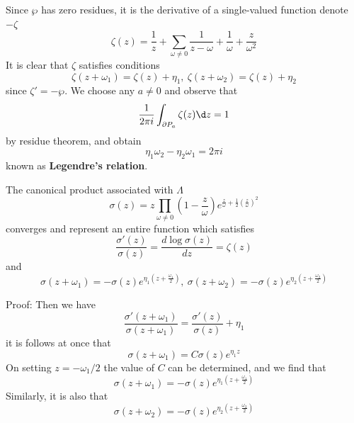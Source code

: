 \documentclass[12pt, oneside]{book}
\begin{document}
\begin{theorem}
    Since $\wp$ has zero residues, it is the derivative of a single-valued function denote $-\zeta$
    \begin{equation*}
        \zeta(z)=\frac{1}{z}+\sum_{\omega\neq 0} \frac{1}{z-\omega} +\frac{1}{\omega} + \frac{z}{\omega^2}
    \end{equation*}
    It is clear that $\zeta$ satisfies conditions
    \begin{equation*}
        \zeta(z+\omega_1)=\zeta(z)+\eta_1,\
        \zeta(z+\omega_2)=\zeta(z)+\eta_2
    \end{equation*}
    since $\zeta'= - \wp$.
    We choose any $a\neq 0 $ and observe that
    \begin{equation*}
        \frac{1}{2\pi i} \int_{\partial P_a} \zeta(z) \d z
        =
        1
    \end{equation*}
    by residue theorem, and obtain
    \begin{equation*}
        \eta_1 \omega_2 -\eta_2 \omega_1 =2\pi i
    \end{equation*}
    known as \textbf{Legendre's relation}.
\end{theorem}

\begin{theorem}
    The canonical product associated with $\Lambda$
    \begin{equation*}
        \sigma(z)
        =
        z\prod_{\omega\neq 0} \left(1-\frac{z}{\omega}\right) e^{\frac{z}{\omega} + \frac{1}{2}\left(\frac{z}{\omega}\right)^2 }
    \end{equation*}
    converges and represent an entire function which satisfies
    \begin{equation*}
        \frac{\sigma'(z)}{\sigma(z)} =\frac{d \log \sigma(z)}{dz} =\zeta(z)
    \end{equation*}
    and
    \begin{equation*}
        \sigma(z+\omega_1)=-\sigma(z) e^{\eta_1 (z+\frac{\omega_1}{2})},\
        \sigma(z+\omega_2)=-\sigma(z) e^{\eta_2 (z+\frac{\omega_2}{2})}
    \end{equation*}

    Proof:
    Then we have
    \[
        \frac{\sigma'(z+\omega_1)}{\sigma(z+\omega_1)}
        =
        \frac{\sigma'(z)}{\sigma(z)} + \eta_1
    \]
    it is follows at once that
    \[
        \sigma(z+\omega_1)=C\sigma(z) e^{\eta_1 z}
    \]
    On setting $z=-\omega_1/2$ the value of $C$ can be determined, and we find that
    \[
        \sigma(z+\omega_1)=-\sigma(z) e^{\eta_1 (z+\frac{\omega_1}{2})}
    \]
    Similarly, it is also that
    \[
        \sigma(z+\omega_2)=-\sigma(z) e^{\eta_2 (z+\frac{\omega_2}{2})}
    \]
\end{theorem}
\end{document}
